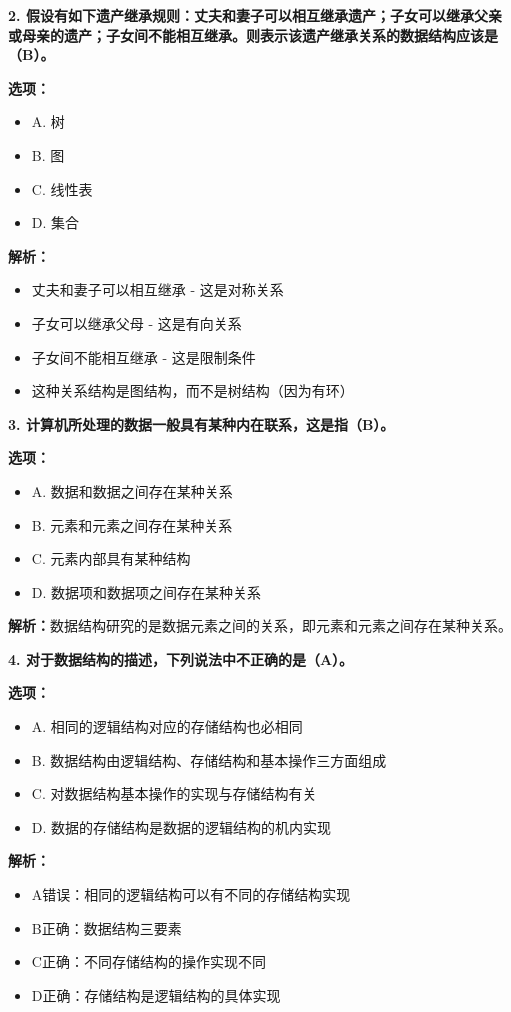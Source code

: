 \documentclass[12pt,a4paper]{amsart}
\begin{document}
\textbf{2. 假设有如下遗产继承规则：丈夫和妻子可以相互继承遗产；子女可以继承父亲或母亲的遗产；子女间不能相互继承。则表示该遗产继承关系的数据结构应该是（B）。}

\textbf{选项：}
\begin{itemize}
\item A. 树
\item B. 图
\item C. 线性表
\item D. 集合
\end{itemize}

\textbf{解析：}
\begin{itemize}
\item 丈夫和妻子可以相互继承 - 这是对称关系
\item 子女可以继承父母 - 这是有向关系
\item 子女间不能相互继承 - 这是限制条件
\item 这种关系结构是图结构，而不是树结构（因为有环）
\end{itemize}

\textbf{3. 计算机所处理的数据一般具有某种内在联系，这是指（B）。}

\textbf{选项：}
\begin{itemize}
\item A. 数据和数据之间存在某种关系
\item B. 元素和元素之间存在某种关系
\item C. 元素内部具有某种结构
\item D. 数据项和数据项之间存在某种关系
\end{itemize}

\textbf{解析：}数据结构研究的是数据元素之间的关系，即元素和元素之间存在某种关系。

\textbf{4. 对于数据结构的描述，下列说法中不正确的是（A）。}

\textbf{选项：}
\begin{itemize}
\item A. 相同的逻辑结构对应的存储结构也必相同
\item B. 数据结构由逻辑结构、存储结构和基本操作三方面组成
\item C. 对数据结构基本操作的实现与存储结构有关
\item D. 数据的存储结构是数据的逻辑结构的机内实现
\end{itemize}

\textbf{解析：}
\begin{itemize}
\item A错误：相同的逻辑结构可以有不同的存储结构实现
\item B正确：数据结构三要素
\item C正确：不同存储结构的操作实现不同
\item D正确：存储结构是逻辑结构的具体实现
\end{itemize}
\end{document}
